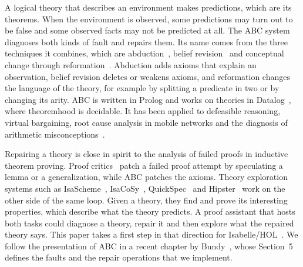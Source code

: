 \documentclass[preprint,12pt]{elsarticle}
\begin{document}
A logical theory that describes an environment makes predictions, which
are its theorems. When the environment is observed, some predictions may
turn out to be false and some observed facts may not be predicted at all.
The ABC system~\cite{LiBundySmaill18,Li21,Bundy26} diagnoses both kinds of
fault and repairs them. Its name comes from the three techniques it
combines, which are abduction~\cite{CoxPietrzykowski86}, belief
revision~\cite{Nebel91} and conceptual change through
reformation~\cite{BundyMitrovic16}. Abduction adds axioms that explain an
observation, belief revision deletes or weakens axioms, and reformation
changes the language of the theory, for example by splitting a predicate in
two or by changing its arity. ABC is written in Prolog and works on
theories in Datalog~\cite{CeriGottlobTanca90}, where theoremhood is
decidable. It has been applied to defeasible reasoning, virtual bargaining,
root cause analysis in mobile networks and the diagnosis of arithmetic
misconceptions~\cite{Bundy26,BundyPhilalithisLi20,LiEtAl22,Tang16}.

Repairing a theory is close in spirit to the analysis of failed proofs in
inductive theorem proving. Proof critics~\cite{IrelandBundy96} patch a
failed proof attempt by speculating a lemma or a generalization, while ABC
patches the axioms. Theory exploration systems such as
IsaScheme~\cite{MontanoRivas12}, IsaCoSy~\cite{JohanssonDixonBundy11},
QuickSpec~\cite{ClaessenSmallboneHughes10} and Hipster~\cite{Hipster14} work
on the other side of the same loop. Given a theory, they find and prove its
interesting properties, which describe what the theory predicts. A proof
assistant that hosts both tasks could diagnose a theory, repair it and then
explore what the repaired theory says. This paper takes a first step in
that direction for Isabelle/HOL~\cite{NipkowPaulsonWenzel02}. We follow the
presentation of ABC in a recent chapter by Bundy~\cite{Bundy26}, whose
Section~5 defines the faults and the repair operations that we implement.
\end{document}
